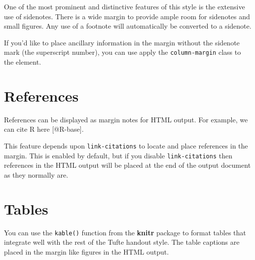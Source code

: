 \documentclass[
  letterpaper,
  DIV=11,
  numbers=noendperiod,
  oneside]{scrartcl}
\begin{document}
One of the most prominent and distinctive features of this style is the
extensive use of sidenotes. There is a wide margin to provide ample room
for sidenotes and small figures. Any use of a footnote will
automatically be converted to a sidenote.

{} If you'd like to place ancillary
information in the margin without the sidenote mark (the superscript
number), you can use apply the \texttt{column-margin} class to the
element.

\hypertarget{references}{%
\section{References}\label{references}}

References can be displayed as margin notes for HTML output. For
example, we can cite R here {[}@R-base{]}.

\begin{tcolorbox}[enhanced jigsaw, left=2mm, bottomrule=.15mm, colframe=quarto-callout-note-color-frame, opacityback=0, leftrule=.75mm, rightrule=.15mm, breakable, toprule=.15mm, arc=.35mm, colback=white]
\begin{minipage}[t]{5.5mm}
\textcolor{quarto-callout-note-color}{\faInfo}
\end{minipage}%
\begin{minipage}[t]{\textwidth - 5.5mm}
This feature depends upon \texttt{link-citations} to locate and place
references in the margin. This is enabled by default, but if you disable
\texttt{link-citations} then references in the HTML output will be
placed at the end of the output document as they normally
are.\end{minipage}%
\end{tcolorbox}

\hypertarget{tables}{%
\section{Tables}\label{tables}}

You can use the \texttt{kable()} function from the \textbf{knitr}
package to format tables that integrate well with the rest of the Tufte
handout style. The table captions are placed in the margin like figures
in the HTML output.
\end{document}
